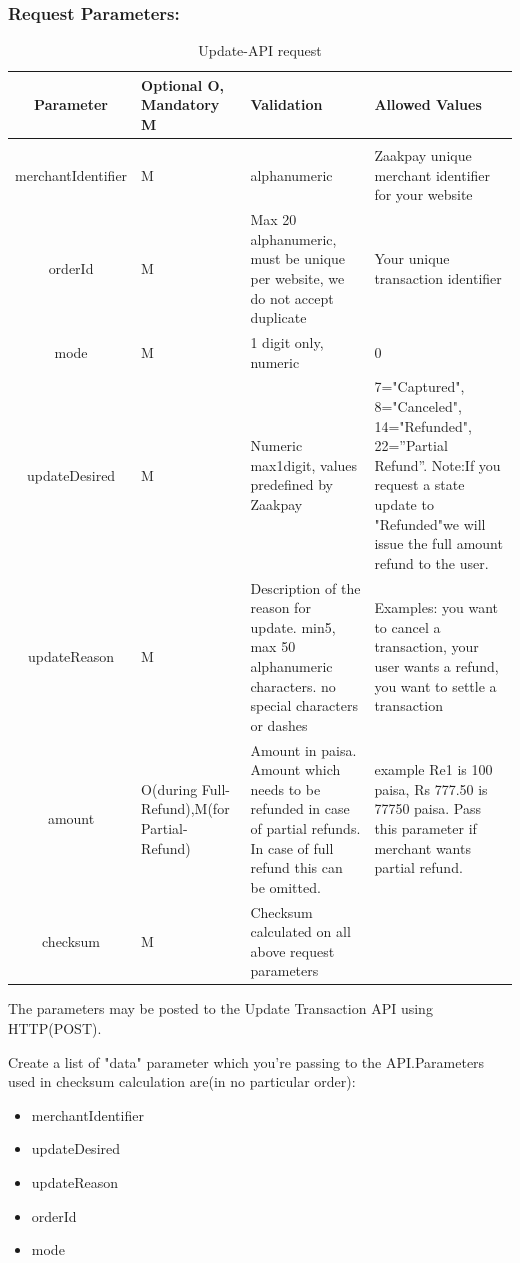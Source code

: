 \documentclass{article}
\begin{document}
\subsubsection{Request Parameters:}
\begin{longtable}{||c| p{2.09cm}| p{5.5cm}| p{4.7cm}||}
\caption{Update-API request}\\
\rowcolor{green!50}
    \bfseries{Parameter} & \bfseries{Optional O, Mandatory M} & \bfseries{Validation} & \bfseries{Allowed Values} \\ \hline
&&&\\
merchantIdentifier & M & alphanumeric & Zaakpay unique
merchant identifier for your website \\
orderId & M & Max 20 alphanumeric, must be unique per
website, we do not accept duplicate & Your unique transaction identifier\\
mode & M & 1 digit only, numeric & 0\\
updateDesired & M & Numeric max1digit, values predefined by Zaakpay & 7="Captured", 8="Canceled", 14="Refunded", 22=”Partial Refund”. Note:If you request a state update to "Refunded"we will issue the full amount refund to the user.\\
updateReason & M & Description of the reason for update. min5, max 50 alphanumeric characters. no special characters or dashes & Examples: you want to cancel a transaction, your user wants a refund, you want to settle a transaction \\
amount & O(during Full-Refund),M(for Partial-Refund) & Amount in paisa. Amount which needs to be refunded in case of partial refunds. In case of full refund this can be omitted. & example Re1 is 100 paisa, Rs 777.50 is 77750 paisa. Pass this parameter if merchant wants partial refund.\\
checksum & M & Checksum calculated on all above request parameters & \\
\end{longtable}

The parameters may be posted to the Update Transaction API using HTTP(POST). 

Create a list of "data" parameter which you're passing to the API.Parameters used in checksum calculation are(in no particular order):

\begin{itemize}
\item merchantIdentifier
\item updateDesired
\item updateReason
\item orderId
\item mode
\end{itemize}
\end{document}
